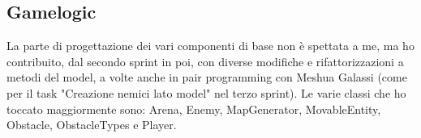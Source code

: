 
\subsection{Gamelogic}
La parte di progettazione dei vari componenti di base non è spettata a me, ma ho contribuito, dal secondo sprint in poi, con diverse modifiche e rifattorizzazioni a metodi del model, a volte anche in pair programming con Meshua Galassi (come per il task "Creazione nemici lato model" nel terzo sprint).
Le varie classi che ho toccato maggiormente sono: Arena, Enemy, MapGenerator, MovableEntity, Obstacle, ObstacleTypes e Player.

